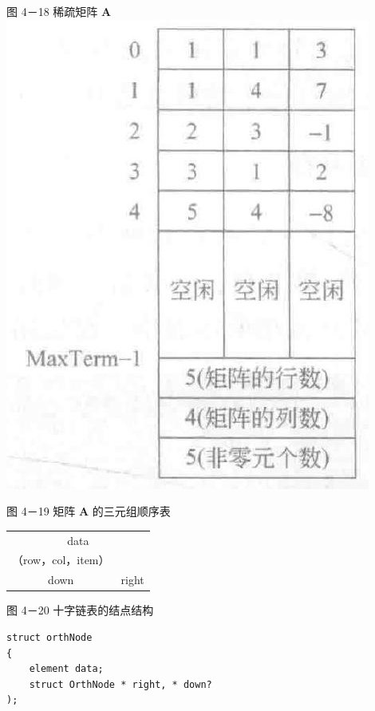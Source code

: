 \documentclass[10pt]{article}
\begin{document}
图 4－18 稀疏矩阵 $\boldsymbol{A}$\\
\includegraphics[max width=\textwidth, center]{2025_06_06_704745ea57b15b2333e5g-126(1)}

图 4－19 矩阵 $\boldsymbol{A}$ 的三元组顺序表

\begin{center}
\begin{tabular}{|c|c|}
\hline
\multicolumn{2}{|c|}{data} \\
（row，col，item） &  \\
\hline
down & right \\
\hline
\end{tabular}
\end{center}

图 4－20 十字链表的结点结构

\begin{verbatim}
struct orthNode
{
    element data;
    struct OrthNode * right, * down?
);
\end{verbatim}
\end{document}
